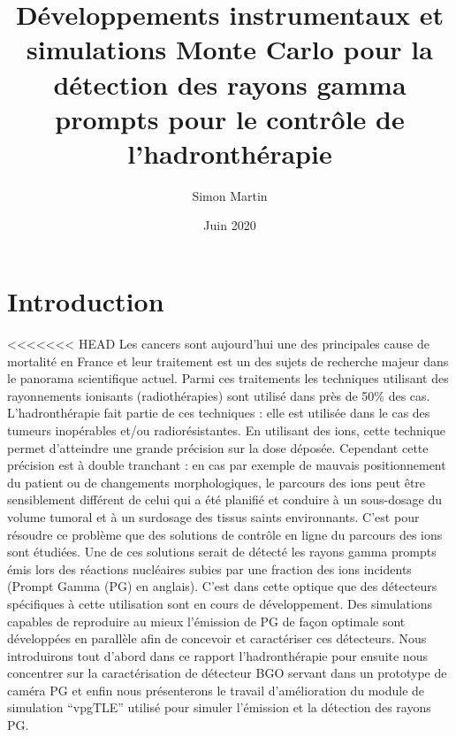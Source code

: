 \documentclass[11pt,a4paper,oldfontcommands]{memoir}
\begin{document}
\title{Développements instrumentaux et simulations Monte Carlo pour la détection des rayons gamma prompts pour le contrôle de l’hadronthérapie}
\author{Simon Martin}
\date{Juin 2020}



\maketitle
\newpage
\tableofcontents
\openany
\chapter{Introduction}
<<<<<<< HEAD
Les cancers sont aujourd'hui une des principales cause de mortalité en France et leur traitement est un des sujets de recherche majeur dans le panorama scientifique actuel. Parmi ces traitements les techniques utilisant des rayonnements ionisants (radiothérapies) sont utilisé dans près de 50\% des cas. L'hadronthérapie fait partie de ces techniques
: elle est utilisée dans le cas des tumeurs inopérables et/ou radiorésistantes. En utilisant des ions, cette technique permet d'atteindre une grande précision sur la dose déposée. Cependant cette précision est à double tranchant : en cas par exemple de mauvais positionnement du patient ou de changements morphologiques, le parcours des ions peut être sensiblement différent de celui qui a été planifié et conduire à un sous-dosage du volume tumoral et à un surdosage des tissus saints environnants. C'est pour résoudre ce problème que des solutions de contrôle en ligne du parcours des ions sont étudiées. Une de ces solutions serait de détecté les rayons gamma prompts émis lors des réactions nucléaires subies par une fraction des ions incidents (Prompt Gamma (PG) en anglais). C'est dans cette optique que des détecteurs spécifiques à cette utilisation sont en cours de développement. Des simulations capables de reproduire au mieux l'émission de PG de façon optimale sont développées en parallèle afin de concevoir et caractériser ces détecteurs. Nous introduirons tout d'abord dans ce rapport l'hadronthérapie pour ensuite nous concentrer sur la caractérisation de détecteur BGO servant dans un prototype de caméra PG et enfin nous présenterons le travail d'amélioration du module de simulation \enquote{vpgTLE} utilisé pour simuler l'émission et la détection des rayons PG. 
\openany
\end{document}
